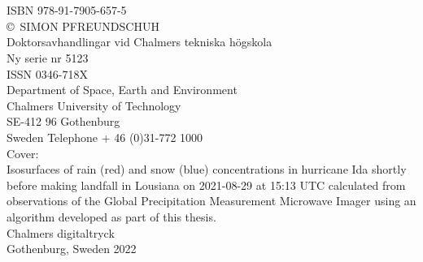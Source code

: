 \thispagestyle{plain}
\vspace*{5cm}

\noindent\textbf{\thetitle}\\[0.2cm]
%
\nodindent \theauthor \\
ISBN 978-91-7905-657-5\\[0.5cm]

\noindent \copyright \ {\sc SIMON PFREUNDSCHUH} \\[0.5cm]



\noindent Doktorsavhandlingar vid Chalmers tekniska högskola \\
Ny serie nr 5123  \\
ISSN 0346-718X  \\[0.5cm]

\noindent Department of Space, Earth and Environment \\
Chalmers University of Technology  \\
SE-412 96 Gothenburg  \\
Sweden 
Telephone + 46 (0)31-772 1000  \\[2cm]

\vfill \noindent Cover:  \\
\noindent Isosurfaces of rain (red) and snow (blue) concentrations in hurricane Ida shortly before making
landfall in Lousiana on 2021-08-29 at 15:13 UTC calculated from observations of
the Global Precipitation Measurement Microwave Imager using an algorithm
developed as part of this thesis.
 \\[0.5cm]

\noindent Chalmers digitaltryck  \\
\noindent Gothenburg, Sweden 2022 

\clearpage
